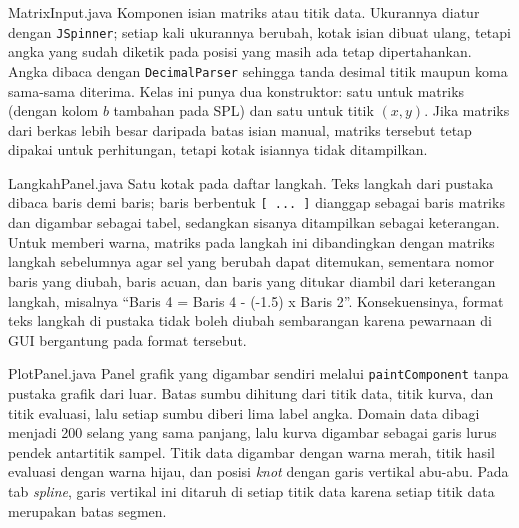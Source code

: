 \begin{kelas}{MatrixInput.java}
Komponen isian matriks atau titik data. Ukurannya diatur dengan \texttt{JSpinner}; setiap kali ukurannya berubah, kotak isian dibuat ulang, tetapi angka yang sudah diketik pada posisi yang masih ada tetap dipertahankan. Angka dibaca dengan \texttt{DecimalParser} sehingga tanda desimal titik maupun koma sama-sama diterima. Kelas ini punya dua konstruktor: satu untuk matriks (dengan kolom $b$ tambahan pada SPL) dan satu untuk titik $(x, y)$. Jika matriks dari berkas lebih besar daripada batas isian manual, matriks tersebut tetap dipakai untuk perhitungan, tetapi kotak isiannya tidak ditampilkan.
 
 
\end{kelas}

\begin{kelas}{LangkahPanel.java}
Satu kotak pada daftar langkah. Teks langkah dari pustaka dibaca baris demi baris; baris berbentuk \texttt{[ ... ]} dianggap sebagai baris matriks dan digambar sebagai tabel, sedangkan sisanya ditampilkan sebagai keterangan. Untuk memberi warna, matriks pada langkah ini dibandingkan dengan matriks langkah sebelumnya agar sel yang berubah dapat ditemukan, sementara nomor baris yang diubah, baris acuan, dan baris yang ditukar diambil dari keterangan langkah, misalnya ``Baris 4 = Baris 4 - (-1.5) x Baris 2''. Konsekuensinya, format teks langkah di pustaka tidak boleh diubah sembarangan karena pewarnaan di GUI bergantung pada format tersebut.
 
\end{kelas}

\begin{kelas}{PlotPanel.java}
Panel grafik yang digambar sendiri melalui \texttt{paintComponent} tanpa pustaka grafik dari luar. Batas sumbu dihitung dari titik data, titik kurva, dan titik evaluasi, lalu setiap sumbu diberi lima label angka. Domain data dibagi menjadi 200 selang yang sama panjang, lalu kurva digambar sebagai garis lurus pendek antartitik sampel. Titik data digambar dengan warna merah, titik hasil evaluasi dengan warna hijau, dan posisi \textit{knot} dengan garis vertikal abu-abu. Pada tab \textit{spline}, garis vertikal ini ditaruh di setiap titik data karena setiap titik data merupakan batas segmen.
\end{kelas}

